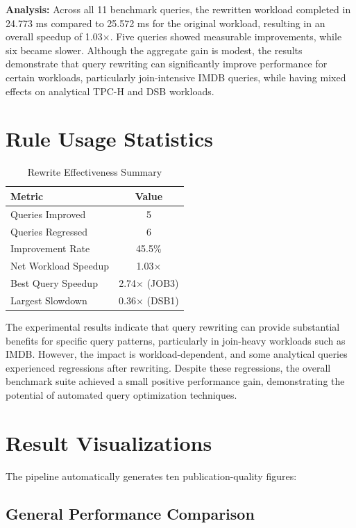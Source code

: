 \documentclass[12pt,a4paper]{article}
\begin{document}
\textbf{Analysis:} Across all 11 benchmark queries, the rewritten workload completed in 24.773 ms compared to 25.572 ms for the original workload, resulting in an overall speedup of 1.03$\times$. Five queries showed measurable improvements, while six became slower. Although the aggregate gain is modest, the results demonstrate that query rewriting can significantly improve performance for certain workloads, particularly join-intensive IMDB queries, while having mixed effects on analytical TPC-H and DSB workloads.

\section{Rule Usage Statistics}

\begin{table}[H]
\centering
\caption{Rewrite Effectiveness Summary}
\begin{tabular}{|l|c|}
\hline
\textbf{Metric} & \textbf{Value} \\
\hline
Queries Improved & 5 \\
Queries Regressed & 6 \\
Improvement Rate & 45.5\% \\
Net Workload Speedup & 1.03$\times$ \\
Best Query Speedup & 2.74$\times$ (JOB3) \\
Largest Slowdown & 0.36$\times$ (DSB1) \\
\hline
\end{tabular}
\end{table}

The experimental results indicate that query rewriting can provide substantial benefits for specific query patterns, particularly in join-heavy workloads such as IMDB. However, the impact is workload-dependent, and some analytical queries experienced regressions after rewriting. Despite these regressions, the overall benchmark suite achieved a small positive performance gain, demonstrating the potential of automated query optimization techniques.

\newpage

\section{Result Visualizations}

The pipeline automatically generates ten publication-quality figures:
\subsection{General Performance Comparison}
\end{document}
